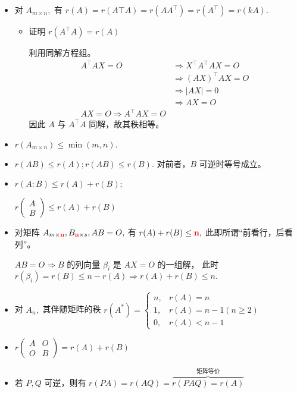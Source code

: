 \begin{itemize}
    \item 对 $ A_{m\times n}, $ 有 $ r(A) = r(A\top A) = r(AA^\top) = r(A^\top) = r(kA). $
    \begin{itemize}
        \item 证明 $ r(A^\top A) = r(A) $ 
        
        利用同解方程组。
        \begin{equation*}
            \begin{aligned}
                A^\top AX = O &\Rightarrow X^\top A^\top AX = O \\ 
                &\Rightarrow (AX)^\top AX = O \\ &\Rightarrow |AX| = 0
                \\ &\Rightarrow AX = O \\ 
                AX = O \Rightarrow A^\top AX = O
            \end{aligned}
        \end{equation*}
        因此 $ A $ 与 $ A^\top A $ 同解，故其秩相等。
    \end{itemize} 
    \item $ r(A_{m\times n})\leq \min(m,n). $ 
    \item $ r(AB) \leq r(A); r(AB) \leq r(B). $ 对前者，$ B $ 可逆时等号成立。
    \item $ r(A:B)\leq r(A) + r(B); $ 
    
    $ r(\begin{matrix}
        A \\ B 
    \end{matrix}) \leq r(A) + r(B)$ 
    \item 对矩阵 $ A_{m\times \textcolor{red}{\bf{n}}},B_{\textcolor{red}{\bf{n}}\times s}, AB=O, $
    有 $ r(A) + r(B) \leq \textcolor{red}{\bf{n}}, $ 此即所谓“前看行，后看列”。

    $AB = O \Rightarrow B $ 的列向量 $ \beta_i $ 是 $ AX=O $ 的一组解，
    此时 $ r(\beta_i) = r(B) \leq n - r(A) \Rightarrow r(A) + r(B) \leq n. $ 
    \item 对 $ A_n, $ 其伴随矩阵的秩
    $ r(A^*)=\begin{cases}
        n,& r(A) = n\\ 1,&r(A) = n-1(n\geq 2)\\ 0,& r(A)< n-1
    \end{cases} $
    \item $ r\begin{pmatrix}
        A & O \\ O & B
    \end{pmatrix} = r(A) + r(B)$ 
    \item 若 $ P,Q $ 可逆，则有
    $ r(PA) = r(AQ) = \overbrace{r(PAQ) = r(A)}^{\textrm{矩阵等价}} $ 
    

\end{itemize}
